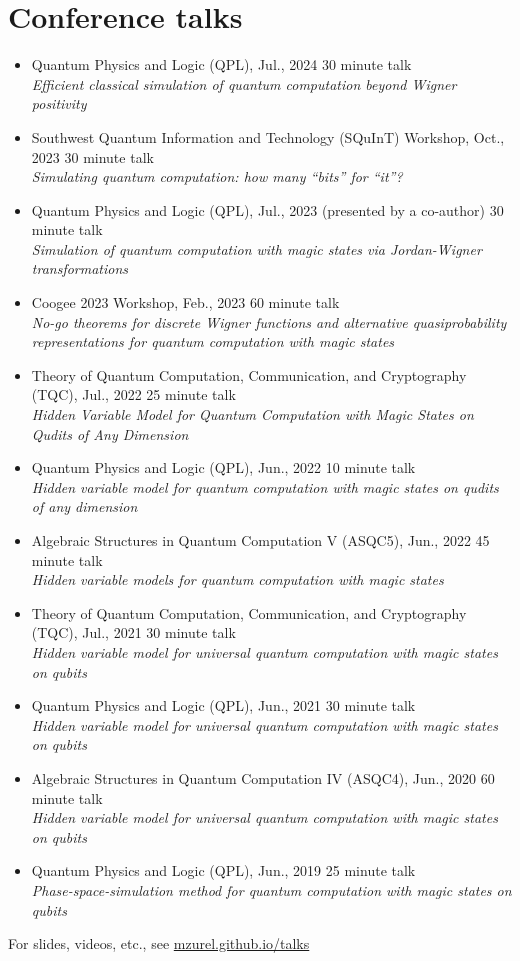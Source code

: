 \documentclass[letterpaper,11pt]{article}
\newcommand{\ConferenceItem}[3]{
	\item{\parbox{0.97\textwidth}{
		{#1}  \hfill {#2}\\
		\emph{#3}
	}}
}
\begin{document}
\section*{Conference talks}
\begin{itemize}[leftmargin=*]
	\ConferenceItem{Quantum Physics and Logic (QPL), Jul., 2024}{30 minute talk}{Efficient classical simulation of quantum computation beyond Wigner positivity}
	
	\ConferenceItem{Southwest Quantum Information and Technology (SQuInT) Workshop, Oct., 2023}{30 minute talk}{Simulating quantum computation: how many ``bits'' for ``it''?}
	
	\ConferenceItem{Quantum Physics and Logic (QPL), Jul., 2023 (presented by a co-author)}{30 minute talk}{Simulation of quantum computation with magic states via Jordan-Wigner transformations}
	
	\ConferenceItem{Coogee 2023 Workshop, Feb., 2023}{60 minute talk}{No-go theorems for discrete Wigner functions and alternative quasiprobability representations for quantum computation with magic states}
	
	\ConferenceItem{Theory of Quantum Computation, Communication, and Cryptography (TQC), Jul., 2022}{25 minute talk}{Hidden Variable Model for Quantum Computation with Magic States on Qudits of Any Dimension}
	
	\ConferenceItem{Quantum Physics and Logic (QPL), Jun., 2022}{10 minute talk}{Hidden variable model for quantum computation with magic states on qudits of any dimension}
	
	\ConferenceItem{Algebraic Structures in Quantum Computation V (ASQC5), Jun., 2022}{45 minute talk}{Hidden variable models for quantum computation with magic states}
	
	\ConferenceItem{Theory of Quantum Computation, Communication, and Cryptography (TQC), Jul., 2021}{30 minute talk}{Hidden variable model for universal quantum computation with magic states on qubits}
	
	\ConferenceItem{Quantum Physics and Logic (QPL), Jun., 2021}{30 minute talk}{Hidden variable model for universal quantum computation with magic states on qubits}
	
	\ConferenceItem{Algebraic Structures in Quantum Computation IV (ASQC4), Jun., 2020}{60 minute talk}{Hidden variable model for universal quantum computation with magic states on qubits}
	
	\ConferenceItem{Quantum Physics and Logic (QPL), Jun., 2019}{25 minute talk}{Phase-space-simulation method for quantum computation with magic states on qubits}
\end{itemize}
For slides, videos, etc., see \href{https://mzurel.github.io/talks}{mzurel.github.io/talks}
\end{document}
